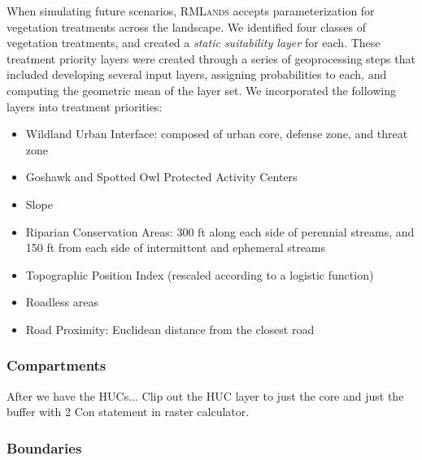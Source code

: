When simulating future scenarios, \textsc{RMLands} accepts parameterization for vegetation treatments across the landscape. We identified four classes of vegetation treatments, and created a \emph{static suitability layer} for each. These treatment priority layers were created through a series of geoprocessing steps that included developing several input layers, assigning probabilities to each, and computing the geometric mean of the layer set. We incorporated the following layers into treatment priorities:
\begin{itemize}
	\item Wildland Urban Interface: composed of urban core, defense zone, and threat zone
	\item Goshawk and Spotted Owl Protected Activity Centers
	\item Slope
	\item Riparian Conservation Areas: 300 ft along each side of perennial streams, and 150 ft from each side of intermittent and ephemeral streams
	\item Topographic Position Index (rescaled according to a logistic function)
	\item Roadless areas
	\item Road Proximity: Euclidean distance from the closest road
\end{itemize}

\subsubsection{Compartments}
After we have the HUCs...
Clip out the HUC layer to just the core and just the buffer with 2 Con statement in raster calculator.




\subsubsection{Boundaries}

